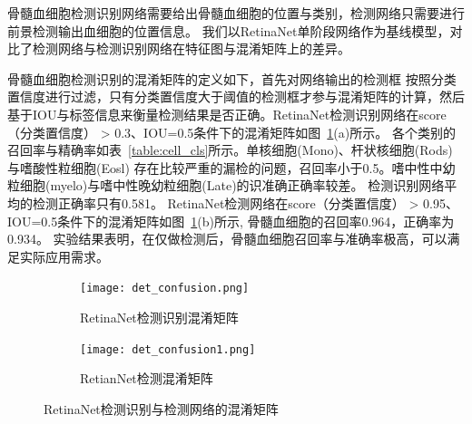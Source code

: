 骨髓血细胞检测识别网络需要给出骨髓血细胞的位置与类别，检测网络只需要进行前景检测输出血细胞的位置信息。
我们以RetinaNet单阶段网络作为基线模型，对比了检测网络与检测识别网络在特征图与混淆矩阵上的差异。

骨髓血细胞检测识别的混淆矩阵的定义如下，首先对网络输出的检测框
按照分类置信度进行过滤，只有分类置信度大于阈值的检测框才参与混淆矩阵的计算，然后
基于IOU与标签信息来衡量检测结果是否正确。RetinaNet检测识别网络在score（分类置信度） > 0.3、IOU=0.5条件下的混淆矩阵如图~\ref{fig:det_confusion}(a)所示。
各个类别的召回率与精确率如表~\ref{table:cell_cls}所示。单核细胞(Mono)、杆状核细胞(Rods)与嗜酸性粒细胞(Eosl)
存在比较严重的漏检的问题，召回率小于0.5。嗜中性中幼粒细胞(myelo)与嗜中性晚幼粒细胞(Late)的识准确正确率较差。
检测识别网络平均的检测正确率只有0.581。
RetinaNet检测网络在score（分类置信度） > 0.95、IOU=0.5条件下的混淆矩阵如图~\ref{fig:det_confusion}(b)所示, 骨髓血细胞的召回率0.964，正确率为0.934。
实验结果表明，在仅做检测后，骨髓血细胞召回率与准确率极高，可以满足实际应用需求。

\begin{table}   
  \caption{RetinaNet网络各类别的准确率与召回率}      
  \centering    
  \label{table:cell_cls}
  \centering  
\end{table}

\begin{figure}[htbp]                  
  \centering                   
	\begin{subfigure}{0.48\linewidth}
		\centering
    \texttt{[image: det\_confusion.png]}                   
    \caption{RetinaNet检测识别混淆矩阵}
	\end{subfigure}
	\begin{subfigure}{0.48\linewidth}
		\centering
		\texttt{[image: det\_confusion1.png]}
    \caption{RetianNet检测混淆矩阵}
	\end{subfigure}
  \caption{RetinaNet检测识别与检测网络的混淆矩阵}                   
  \label{fig:det_confusion}      
\end{figure}   

